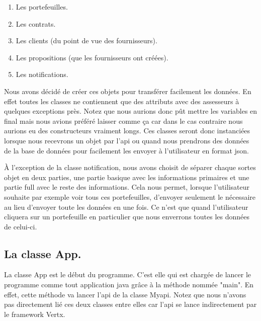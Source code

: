 \begin{enumerate}[-]
\item Les portefeuilles.
\item Les contrats.
\item Les clients (du point de vue des fournisseurs).
\item Les propositions (que les fournisseurs ont créées).
\item Les notifications.
\end{enumerate}

\begin{flushleft}
Nous avons décidé de créer ces objets pour transférer facilement les données. En effet toutes les classes ne contiennent que des attributs avec des assesseurs à quelques exceptions près. Notez que nous aurions donc pût mettre les variables en final mais nous avions préféré laisser comme ça car dans le cas contraire nous aurions eu des constructeurs vraiment longs. Ces classes seront donc instanciées lorsque nous recevrons un objet par l'api ou quand nous prendrons des données de la base de données pour facilement les envoyer à l'utilisateur en format json.
\end{flushleft}

\begin{flushleft}
À l'exception de la classe notification, nous avons choisit de séparer chaque sortes objet en deux parties, une partie basique avec les informations primaires et une partie full avec le reste des informations. Cela nous permet, lorsque l'utilisateur souhaite par exemple voir tous ces portefeuilles, d'envoyer seulement le nécessaire au lieu d'envoyer toute les données en une fois. Ce n'est que quand l'utilisateur cliquera sur un portefeuille en particulier que nous enverrons toutes les données de celui-ci.
\end{flushleft}

\subsection{La classe App.}

\begin{flushleft}
La classe App est le début du programme. C'est elle qui est chargée de lancer le programme comme tout application java grâce à la méthode nommée "main". En effet, cette méthode va lancer l'api de la classe Myapi. Notez que nous n'avons pas directement lié ces deux classes entre elles car l'api se lance indirectement par le framework Vertx.
\end{flushleft}

